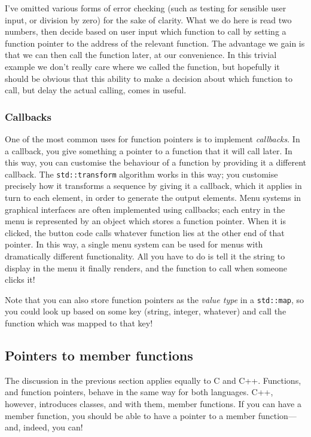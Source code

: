 \documentclass[a4paper]{scrartcl}
\begin{document}


I've omitted various forms of error checking (such as testing for sensible user input, or division by zero) for the sake of clarity. What we do here is read two numbers, then decide based on user input which function to call by setting a function pointer to the address of the relevant function. The advantage we gain is that we can then call the function later, at our convenience. In this trivial example we don't really care where we called the function, but hopefully it should be obvious that this ability to make a decision about which function to call, but delay the actual calling, comes in useful.

\subsubsection{Callbacks}
One of the most common uses for function pointers is to implement \emph{callbacks}. In a callback, you give something a pointer to a function that it will call later. In this way, you can customise the behaviour of a function by providing it a different callback. The \texttt{std::transform} algorithm works in this way; you customise precisely how it transforms a sequence by giving it a callback, which it applies in turn to each element, in order to generate the output elements. Menu systems in graphical interfaces are often implemented using callbacks; each entry in the menu is represented by an object which stores a function pointer. When it is clicked, the button code calls whatever function lies at the other end of that pointer. In this way, a single menu system can be used for menus with dramatically different functionality. All you have to do is tell it the string to display in the menu it finally renders, and the function to call when someone clicks it!

Note that you can also store function pointers as the \emph{value type} in a \texttt{std::map}, so you could look up based on some key (string, integer, whatever) and call the function which was mapped to that key!

\subsection{Pointers to member functions}
The discussion in the previous section applies equally to C and C++. Functions, and function pointers, behave in the same way for both languages. C++, however, introduces classes, and with them, member functions. If you can have a member function, you should be able to have a pointer to a member function---and, indeed, you can!
\end{document}

